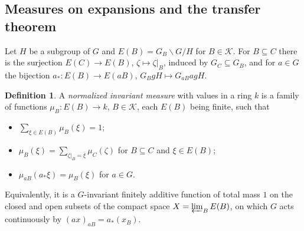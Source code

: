 \documentclass[11pt,a4paper]{article}
\theoremstyle{definition}
\newtheorem{definition}[theorem]{Definition}
\newcommand{\K}{\mathcal{K}}
\begin{document}
\subsection{Measures on expansions and the transfer theorem}

Let $H$ be a subgroup of $G$ and $E(B)=G_B\backslash G/H$ for $B\in\K$. For
$B\subseteq C$ there is the surjection $E(C)\to E(B)$,
$\zeta\mapsto\zeta|_B$, induced by $G_C\subseteq G_B$, and for $a\in G$ the
bijection $a_*\colon E(B)\to E(aB)$, $G_BgH\mapsto G_{aB}agH$.

\begin{definition}\label{def:measure}
A \emph{normalized invariant measure} with values in a ring $k$ is a family
of functions $\mu_B\colon E(B)\to k$, $B\in\K$, each $E(B)$ being finite,
such that
\begin{itemize}
\item[\textup{(i)}] $\sum_{\xi\in E(B)}\mu_B(\xi)=1$;
\item[\textup{(ii)}] $\mu_B(\xi)=\sum_{\zeta|_B=\xi}\mu_C(\zeta)$ for
$B\subseteq C$ and $\xi\in E(B)$;
\item[\textup{(iii)}] $\mu_{aB}(a_*\xi)=\mu_B(\xi)$ for $a\in G$.
\end{itemize}
\end{definition}

Equivalently, it is a $G$-invariant finitely additive function of total
mass $1$ on the closed and open subsets of the compact space
$X=\varprojlim_BE(B)$, on which $G$ acts continuously by
$(ax)_{aB}=a_*(x_B)$.
\end{document}
